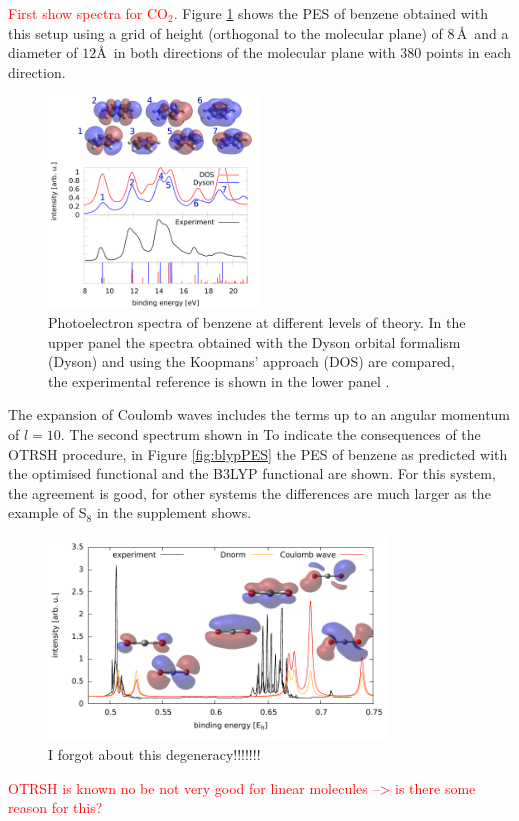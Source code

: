 \textcolor{red}{First show spectra for CO$_2$.}
Figure \ref{fig:benzPES} shows the PES of benzene obtained with this setup using a grid of height (orthogonal to the molecular plane) of $8\,$\AA\, and a diameter of $12$\AA\, in both directions of the molecular plane with $380$ points in each direction.
\begin{figure}
   \includegraphics[width=0.5\textwidth]{Figures/Benzene/Benzene}
   \caption{Photoelectron spectra of benzene at different levels of theory.
   In the upper panel the spectra obtained with the Dyson orbital formalism (Dyson) and using the Koopmans' approach (DOS) are compared, the experimental reference is shown in the lower panel \cite{BenzExp}.}
   \label{fig:benzPES}
\end{figure}
The expansion of Coulomb waves includes the terms up to an angular momentum of $l=10$.
The second spectrum shown in 
To indicate the consequences of the OTRSH procedure, in Figure \ref{fig:blypPES} the PES of benzene as predicted with the optimised functional and the B3LYP functional are shown.
For this system, the agreement is good, for other systems the differences are much larger as the example of S$_8$ in the supplement shows.
\begin{figure}
   \includegraphics[width=0.8\textwidth]{Figures/CO2/CO2_spect}
   \caption{I forgot about this degeneracy!!!!!!!}
\end{figure}
\textcolor{red}{
OTRSH is known no be not very good for linear molecules --> is there some reason for this?
}

